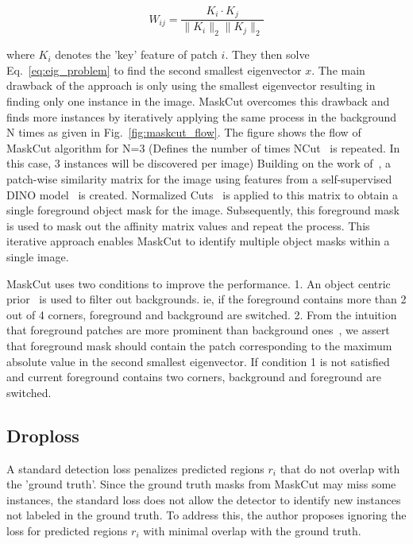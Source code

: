 \begin{equation}
W_{ij} = \frac{K_i \cdot K_j}{\|K_i\|_2 \|K_j\|_2}
\end{equation}

where \( K_i \) denotes the 'key' feature of patch \( i \). They then solve Eq.~\ref{eq:eig_problem} to find the second smallest eigenvector \( x \). The main drawback of the approach is only using the smallest eigenvector resulting in finding only one instance in the image. MaskCut overcomes this drawback and finds more instances by iteratively applying the same process in the background N times as given in Fig.~\ref{fig:maskcut_flow}. The figure shows the flow of MaskCut algorithm for N=3 (Defines the number of times NCut~\cite{normcut} is repeated. In this case, 3 instances will be discovered per image) Building on the work of~\cite{wang2023tokencutsegmentingobjectsimages, caron2021emergingpropertiesselfsupervisedvision}, a patch-wise similarity matrix for the image using features from a self-supervised DINO model~\cite{caron2021emerging} is created. Normalized Cuts~\cite{normcut} is applied to this matrix to obtain a single foreground object mask for the image. Subsequently, this foreground mask is used to mask out the affinity matrix values and repeat the process. This iterative approach enables MaskCut to identify multiple object masks within a single image.

MaskCut uses two conditions to improve the performance.  1. An object centric prior~\cite{obj_centric_prior} is used to filter out backgrounds. ie, if the foreground contains more than 2 out of 4 corners, foreground and background are switched. 2. From the intuition that foreground patches are more prominent than background ones~\cite{caron2021emergingpropertiesselfsupervisedvision, cond1_support_2}, we assert that foreground mask should contain the patch corresponding to the maximum absolute value in the second smallest eigenvector. If condition 1 is not satisfied and current foreground contains two corners, background and foreground are switched.

\subsection{Droploss}
A standard detection loss penalizes predicted regions \( r_i \) that do not overlap with the 'ground truth'. Since the ground truth masks from MaskCut may miss some instances, the standard loss does not allow the detector to identify new instances not labeled in the ground truth. To address this, the author proposes ignoring the loss for predicted regions \( r_i \) with minimal overlap with the ground truth.

